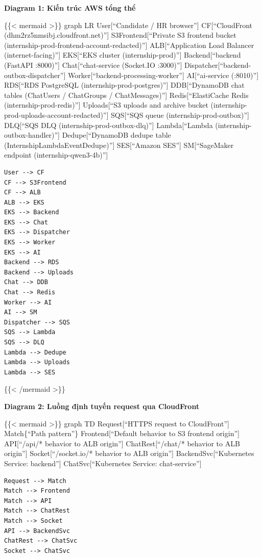 \vspace{0.5em}\noindent\textbf{Diagram 1: Kiến trúc AWS tổng
thể}\par

\{\{\textless{} mermaid \textgreater\}\} graph LR User{[}``Candidate /
HR browser''{]} CF{[}``CloudFront (dhm2rz5nmsibj.cloudfront.net)''{]}
S3Frontend{[}``Private S3 frontend bucket
(internship-prod-frontend-account-redacted)''{]} ALB{[}``Application
Load Balancer (internet-facing)''{]} EKS{[}``EKS cluster
(internship-prod)''{]} Backend{[}``backend (FastAPI :8000)''{]}
Chat{[}``chat-service (Socket.IO :3000)''{]}
Dispatcher{[}``backend-outbox-dispatcher''{]}
Worker{[}``backend-processing-worker''{]} AI{[}``ai-service (:8010)''{]}
RDS{[}``RDS PostgreSQL (internship-prod-postgres)''{]} DDB{[}``DynamoDB
chat tables (ChatUsers / ChatGroups / ChatMessages)''{]}
Redis{[}``ElastiCache Redis (internship-prod-redis)''{]} Uploads{[}``S3
uploads and archive bucket
(internship-prod-uploads-account-redacted)''{]} SQS{[}``SQS queue
(internship-prod-outbox)''{]} DLQ{[}``SQS DLQ
(internship-prod-outbox-dlq)''{]} Lambda{[}``Lambda
(internship-outbox-handler)''{]} Dedupe{[}``DynamoDB dedupe table
(InternshipLambdaEventDedupe)''{]} SES{[}``Amazon SES''{]}
SM{[}``SageMaker endpoint (internship-qwen3-4b)''{]}

\begin{verbatim}
User --> CF
CF --> S3Frontend
CF --> ALB
ALB --> EKS
EKS --> Backend
EKS --> Chat
EKS --> Dispatcher
EKS --> Worker
EKS --> AI
Backend --> RDS
Backend --> Uploads
Chat --> DDB
Chat --> Redis
Worker --> AI
AI --> SM
Dispatcher --> SQS
SQS --> Lambda
SQS --> DLQ
Lambda --> Dedupe
Lambda --> Uploads
Lambda --> SES
\end{verbatim}

\{\{\textless{} /mermaid \textgreater\}\}

\vspace{0.5em}\noindent\textbf{Diagram 2: Luồng định tuyến request qua
CloudFront}\par

\{\{\textless{} mermaid \textgreater\}\} graph TD Request{[}``HTTPS
request to CloudFront''{]} Match\{``Path pattern''\}
Frontend{[}``Default behavior to S3 frontend origin''{]} API{[}``/api/*
behavior to ALB origin''{]} ChatRest{[}``/chat/* behavior to ALB
origin''{]} Socket{[}``/socket.io/* behavior to ALB origin''{]}
BackendSvc{[}``Kubernetes Service: backend''{]} ChatSvc{[}``Kubernetes
Service: chat-service''{]}

\begin{verbatim}
Request --> Match
Match --> Frontend
Match --> API
Match --> ChatRest
Match --> Socket
API --> BackendSvc
ChatRest --> ChatSvc
Socket --> ChatSvc
\end{verbatim}

